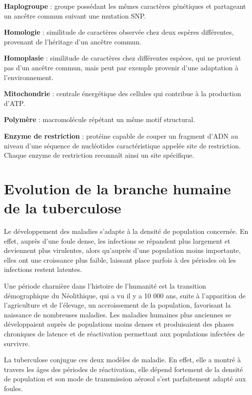 \documentclass[twoside,a4paper,11pt,frenchb,openany]{report}
\begin{document}
\textbf{Haplogroupe} : groupe possédant les mêmes caractères génétiques et partageant un ancêtre commun suivant une mutation SNP.

\textbf{Homologie} : similitude de caractères observée chez deux espères différentes, provenant de l'héritage d'un ancêtre commun. 

\textbf{Homoplasie} : similitude de caractères chez différentes espèces, qui ne provient pas d'un ancêtre commun, mais peut par exemple provenir d'une adaptation à l'environnement.

\textbf{Mitochondrie} : centrale énergétique des cellules qui contribue à la production d'ATP.

\textbf{Polymère} : macromolécule répétant un même motif structural.

\textbf{Enzyme de restriction} : protéine capable de couper un fragment d'ADN au niveau d'une séquence de nucléotides caractéristique appelée site de restriction. Chaque enzyme de restriction reconnaît ainsi un site spécifique.

\section{Evolution de la branche humaine de la tuberculose}

Le développement des maladies s'adapte à la densité de population concernée. En effet, auprès d'une foule dense, les infections se répandent plus largement et deviennent plus virulentes, alors qu'auprès d'une population moins importante, elles ont une croissance plus faible, laissant place parfois à des périodes où les infections restent latentes.

Une période charnière dans l'histoire de l'humanité est la transition démographique du Néolithique, qui a vu il y a 10 000 ans, suite à l'apparition de l'agriculture et de l'élevage, un accroissement de la population, favorisant la naissance de nombreuses maladies. Les maladies humaines plus anciennes se développaient auprès de populations moins denses et produisaient des phases chroniques de latence et de réactivation permettant aux populations infectées de survivre.

La tuberculose conjugue ces deux modèles de maladie. En effet, elle a montré à travers les âges des périodes de réactivation, elle dépend fortement de la densité de population et son mode de transmission aérosol s'est parfaitement adapté aux foules.
\end{document}
